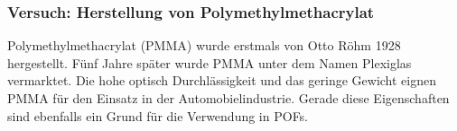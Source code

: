 \subsubsection{Versuch: Herstellung von Polymethylmethacrylat}

Polymethylmethacrylat (PMMA) wurde erstmals von Otto Röhm 1928 hergestellt. Fünf
Jahre später wurde PMMA unter dem Namen
Plexiglas\textsuperscript{\textregistered} vermarktet. Die hohe optisch
Durchlässigkeit und das geringe Gewicht eignen PMMA für den Einsatz in der
Automobielindustrie. Gerade diese Eigenschaften sind ebenfalls ein Grund für die
Verwendung in POFs. \cite{pofwuppmma}
